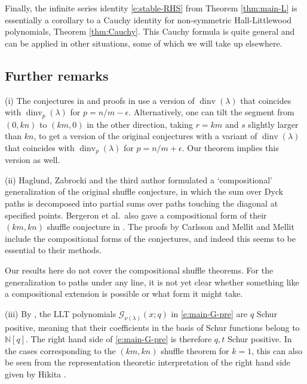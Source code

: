 \documentclass[12pt]{amsart}
\theoremstyle{definition}
\theoremstyle{remark}
\newcommand{\NN}{{\mathbb N}}
\newcommand{\Gcal}{{\mathcal G}}
\DeclareMathOperator{\dinv}{dinv}
\begin{document}
Finally, the infinite series identity \eqref{e:stable-RHS} from
Theorem \ref{thm:main-L} is essentially a corollary to a Cauchy
identity for non-symmetric Hall-Littlewood polynomials, Theorem
\ref{thm:Cauchy}.  This Cauchy formula is quite general and can be
applied in other situations, some of which we will take up elsewhere.


\subsection{Further remarks}
\label{ss:further-remarks}

(i) The conjectures in \cite{BeGaSeXi16, HaHaLoReUl05} and proofs in
\cite{CarlMell18, Mellit16} use a version of $\dinv (\lambda )$ that
coincides with $\dinv _{p}(\lambda )$ for $p = n/m-\epsilon $.
Alternatively, one can tilt the segment from $(0,kn)$ to $(km,0)$ in
the other direction, taking $r = km$ and $s$ slightly larger than
$kn$, to get a version of the original conjectures with a variant of
$\dinv (\lambda )$ that coincides with $\dinv _{p}(\lambda )$ for $p =
n/m+\epsilon $.  Our theorem implies this version as well.

\smallskip

(ii) Haglund, Zabrocki and the third author \cite{HagMoZa12}
formulated a `compositional' generalization of the original shuffle
conjecture, in which the sum over Dyck paths is decomposed into
partial sums over paths touching the diagonal at specified points.
Bergeron et al.\ also gave a compositional form of their $(km,kn)$
shuffle conjecture in \cite{BeGaSeXi16}.  The proofs by Carlsson and
Mellit \cite{CarlMell18} and Mellit \cite{Mellit16} include the
compositional forms of the conjectures, and indeed this seems to be
essential to their methods.

Our results here do not cover the compositional shuffle 
theorems.
For the generalization to paths under any line, it is not yet clear
whether something like a compositional extension is possible or what
form it might take.

\smallskip

(iii) By \cite[Proposition 5.3.1]{HaHaLoReUl05}, the LLT polynomials
$\Gcal _{\nu (\lambda )}(x;q)$ in \eqref{e:main-G-pre} are $q$ Schur
positive, meaning that their coefficients in the basis of Schur
functions belong to $\NN [q]$.  The right hand side of
\eqref{e:main-G-pre} is therefore $q,t$ Schur positive.  In the cases
corresponding to the $(km,kn)$ shuffle theorem for $k = 1$, this can
also be seen from the representation theoretic interpretation of the
right hand side given by Hikita \cite{Hikita14}.
\end{document}
